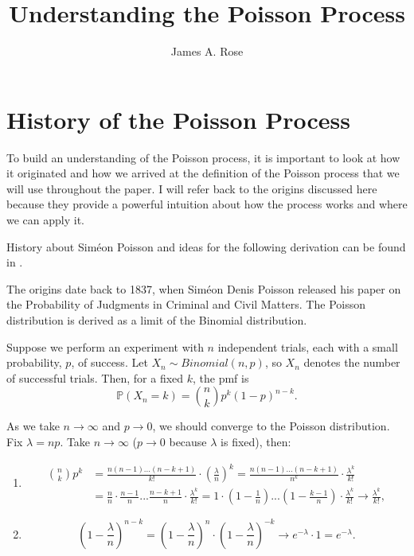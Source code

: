 \documentclass[11pt, oneside]{article}   	%
\title{Understanding the Poisson Process}
\author{James A. Rose}
\theoremstyle{definition}
\theoremstyle{remark}
\begin{document}
\maketitle

\tableofcontents

\newpage
\section{History of the Poisson Process} \label{history}
To build an understanding of the Poisson process, it is important to look at how it originated and how we arrived at the definition of the Poisson process that we will use throughout the paper. I will refer back to the origins discussed here because they provide a powerful intuition about how the process works and where we can apply it.

History about Siméon Poisson and ideas for the following derivation can be found in \cite{poisson2026}.

The origins date back to 1837, when Siméon Denis Poisson released his paper on the Probability of Judgments in Criminal and Civil Matters. The Poisson distribution is derived as a limit of the Binomial distribution.

\vspace{5mm}

Suppose we perform an experiment with $n$ independent trials, each with a small probability, $p$, of success. Let $X_n \sim \textit{Binomial}(n,p)$, so $X_n$ denotes the number of successful trials. Then, for a fixed $k$, the pmf is $$\mathbb{P}(X_n=k)=\binom{n}{k}p^k(1-p)^{n-k}.$$

As we take $n\to\infty$ and $p\to0$, we should converge to the Poisson distribution. 
Fix $\lambda=np$. Take $n\to\infty$ ($p\to0$ because $\lambda$ is fixed), then:

\begin{enumerate}[label=(\roman*)] 
  \item \begin{align*}
      \binom{n}{k} p^k &= \frac{n(n-1)...(n-k+1)}{k!}\cdot \left(\frac{\lambda}{n}\right)^k = \frac{n(n-1)...(n-k+1)}{n^k}\cdot \frac{\lambda^k}{k!} \\
		       &= \frac{n}{n}\cdot\frac{n-1}{n}...\frac{n-k+1}{n}\cdot \frac{\lambda^k}{k!} = 1\cdot\left( 1-\frac{1}{n}\right)...\left( 1-\frac{k-1}{n}\right)\cdot \frac{\lambda^k}{k!} \to \frac{\lambda^k}{k!},
    \end{align*}
  \item $$\left(1-\frac{\lambda}{n}\right)^{n-k}=\left(1-\frac{\lambda}{n}\right)^n\cdot\left(1-\frac{\lambda}{n}\right)^{-k} \to e^{-\lambda}\cdot 1 = e^{-\lambda}.$$
\end{enumerate}
\end{document}
